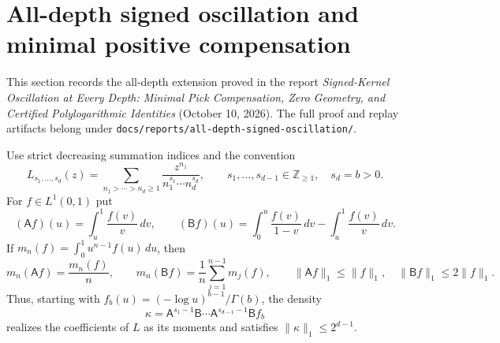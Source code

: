 \providecommand{\ADOA}{\mathsf A}
\providecommand{\ADOB}{\mathsf B}
\providecommand{\ADOIm}{\operatorname{Im}}
\section{All-depth signed oscillation and minimal positive compensation}
\label{ado:integration:section}
This section records the all-depth extension proved in the report
\emph{Signed-Kernel Oscillation at Every Depth: Minimal Pick Compensation,
Zero Geometry, and Certified Polylogarithmic Identities} (October 10, 2026).
The full proof and replay artifacts belong under
\texttt{docs/reports/all-depth-signed-oscillation/}.

Use strict decreasing summation indices and the convention
\[
 L_{s_1,\ldots,s_d}(z)=
 \sum_{n_1>\cdots>n_d\ge1}
 \frac{z^{n_1}}{n_1^{s_1}\cdots n_d^{s_d}},
 \qquad s_1,\ldots,s_{d-1}\in\mathbb Z_{\ge1},\quad s_d=b>0.
\]
For $f\in L^1(0,1)$ put
\[
 (\ADOA f)(u)=\int_u^1\frac{f(v)}v\,dv,
 \qquad
 (\ADOB f)(u)=\int_0^u\frac{f(v)}{1-v}\,dv-
                         \int_u^1\frac{f(v)}v\,dv.
\]
If $m_n(f)=\int_0^1u^{n-1}f(u)\,du$, then
\[
 m_n(\ADOA f)=\frac{m_n(f)}n,
 \qquad m_n(\ADOB f)=\frac1n\sum_{j=1}^{n-1}m_j(f),
 \qquad \|\ADOA f\|_1\le\|f\|_1,\quad
 \|\ADOB f\|_1\le2\|f\|_1.
\]
Thus, starting with $f_b(u)=(-\log u)^{b-1}/\Gamma(b)$, the density
\[
 \kappa=\ADOA^{s_1-1}\ADOB\cdots
             \ADOA^{s_{d-1}-1}\ADOB f_b
\]
realizes the coefficients of $L$ as its moments and satisfies
$\|\kappa\|_1\le2^{d-1}$.

